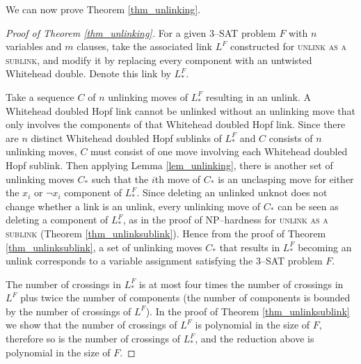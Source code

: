 \documentclass[12pt]{amsart}
\theoremstyle{definition}
\theoremstyle{remark}
\begin{document}
We can now prove Theorem \ref{thm_unlinking}.

\begin{proof}[Proof of Theorem \ref{thm_unlinking}]
For a given 3--\textsc{SAT} problem $F$ with $n$ variables and $m$ clauses, take the associated link $L^F$ constructed for \textsc{unlink as a sublink}, and modify it by replacing every component with an untwisted Whitehead double. Denote this link by $L_{*}^F$.

Take a sequence $C$ of $n$ unlinking moves of $L_{*}^F$ resulting in an unlink. A Whitehead doubled Hopf link cannot be unlinked without an unlinking move that only involves the components of that Whitehead doubled Hopf link.  Since there are $n$ distinct Whitehead doubled Hopf sublinks of $L_{*}^F$ and $C$ consists of $n$ unlinking moves, $C$ must consist of one move involving each Whitehead doubled Hopf sublink.  Then applying Lemma \ref{lem_unlinking}, there is another set of unlinking moves $C_*$ such that the $i$th move of $C_*$ is an unclasping move for either the $x_i$ or $\neg x_i$ component of $L_*^F$.  Since deleting an unlinked unknot does not change whether a link is an unlink, every unlinking move of $C_*$ can be seen as deleting a component of $L_*^F$, as in the proof of NP--hardness for \textsc{unlink as a sublink} (Theorem \ref{thm_unlinksublink}).  Hence from the proof of Theorem \ref{thm_unlinksublink}, a set of unlinking moves $C_*$ that results in $L_*^F$ becoming an unlink corresponds to a variable assignment satisfying the 3--\textsc{SAT} problem $F$.

The number of crossings in $L_*^F$ is at most four times the number of crossings in $L^F$ plus twice the number of components (the number of components is bounded by the number of crossings of $L^F$). In the proof of Theorem \ref{thm_unlinksublink} we show that the number of crossings of $L^F$ is polynomial in the size of $F$, therefore so is the number of crossings of $L^F_*$, and the reduction above is polynomial in the size of $F$. \end{proof}
\end{document}
